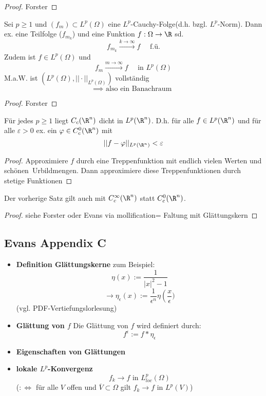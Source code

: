\begin{proof}
	Forster
\end{proof}

\begin{satz} \enter
	Sei $p \geq 1$ und $(f_m) \subset L^p(\Omega)$ eine $L^p$-Cauchy-Folge(d.h.
	bzgl. $L^p$-Norm).\enter
	Dann ex. eine Teilfolge ($f_{m_k}$) und eine Funktion
	$f:\Omega\to \R$ sd. 
	\[f_{m_k} \overset{k\to \infty}{\longrightarrow} f \quad \text{ f.ü.}\]
	Zudem ist $f\in L^p(\Omega)$ und
	\[f_m \stackrel{m\rightarrow \infty}{\longrightarrow} f \quad \text{ in }
	L^p(\Omega)\]
	M.a.W. ist $\left(L^p(\Omega), ||\cdot||_{L^p(\Omega)}\right)$ vollst\"andig 
	\[\implies \text{ also ein Banachraum } \]
\end{satz}

\begin{proof}
	Forster
\end{proof}

\begin{satz} \enter
	Für jedes $p \geq 1$ liegt $C_c(\R^n)$ dicht in $L^p(\R^n)$. \enter
	D.h. für alle $f \in L^p(\R^n)$ und für alle $\varepsilon > 0$ ex. ein
	$\varphi \in C^0_c(\R^n)$ mit 
	\[||f-\varphi||_{ L^p(\R^n)} < \varepsilon\]
\end{satz}

\begin{proof}
	Approximiere $f$ durch eine Treppenfunktion mit endlich vielen Werten und \glqq sch\"onen\grqq\ Urbildmengen. Dann approximiere diese Treppenfunktionen durch stetige Funktionen
\end{proof}

\begin{satz}\enter
	Der vorherige Satz gilt auch mit $C^\infty_c(\R^n)$ statt $C^0_c(\R^n)$.
\end{satz}

\begin{proof}
	siehe Forster oder Evans via \glqq mollification\grqq = Faltung mit Glättungskern
\end{proof}


\subsection{Evans Appendix C}

\begin{itemize}
	\item \textbf{Definition Glättungskerne} \enter
		zum Beispiel:
		\[\eta(x):= \frac{1}{|x|^2-1}\]
		\[\rightarrow \eta_\epsilon(x):=\frac{1}{\epsilon^n}\eta\left(\frac{x}{\epsilon})\]
			(vgl. PDF-Vertiefungslorlesung)
		\item \textbf{Glättung von $f$} \enter
			Die Glättung von $f$ wird definiert durch:
			\[f^\epsilon:=f\ast\eta_\epsilon\]
		\item \textbf{Eigenschaften von Glättungen}
			\newpage
		\item \textbf{lokale $L^p$-Konvergenz}\enter
			\[f_k \rightarrow f \text{ in } L^p_{loc}(\Omega)\]
			($:\iff$ für alle $V$ offen und $\overline{V}\subset\Omega$ gilt
				$f_k\rightarrow f \text{ in } L^p(V)$)
\end{itemize}

